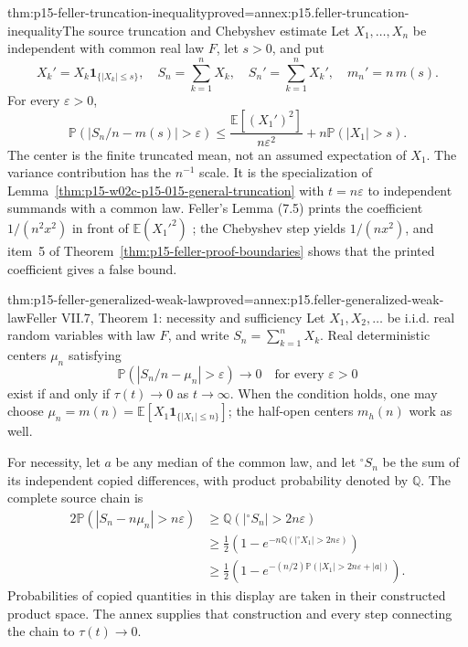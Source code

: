 \begin{hbtheorem}{thm:p15-feller-truncation-inequality}{proved=annex:p15.feller-truncation-inequality}{The source truncation and Chebyshev estimate}
Let \(X_1,\ldots,X_n\) be independent with common real law \(F\),
let \(s>0\), and put
\[
 X_k'=X_k\mathbf1_{\{|X_k|\leq s\}},\quad
 S_n=\sum_{k=1}^nX_k,\quad S_n'=\sum_{k=1}^nX_k',
 \quad m_n'=n\,m(s).
\]
For every \(\varepsilon>0\),
\[
 \mathbb P(|S_n/n-m(s)|>\varepsilon)
 \leq\frac{\mathbb E[(X_1')^2]}{n\varepsilon^2}
                         +n\mathbb P(|X_1|>s).
\]
The center is the finite truncated mean, not an assumed expectation
of \(X_1\). The variance contribution has the \(n^{-1}\) scale.
It is the specialization of
Lemma~\ref{thm:p15-w02c-p15-015-general-truncation} with
\(t=n\varepsilon\) to independent summands with a common law. Feller's
Lemma (7.5) prints the coefficient \(1/(n^2x^2)\) in front of
\(\mathbb E(X_1'^2)\) \cite[VII.7, p.~235]{Feller1971ProbabilityII};
the Chebyshev step yields \(1/(nx^2)\), and item~5 of
Theorem~\ref{thm:p15-feller-proof-boundaries} shows that the printed
coefficient gives a false bound.
\end{hbtheorem}

\begin{hbtheorem}{thm:p15-feller-generalized-weak-law}{proved=annex:p15.feller-generalized-weak-law}{Feller VII.7, Theorem 1: necessity and sufficiency}
Let \(X_1,X_2,\ldots\) be i.i.d. real random variables with law
\(F\), and write \(S_n=\sum_{k=1}^nX_k\). Real deterministic
centers \(\mu_n\) satisfying
\[
 \mathbb P(|S_n/n-\mu_n|>\varepsilon)\longrightarrow0
                           \quad\text{for every }\varepsilon>0
\]
exist if and only if \(\tau(t)\to0\) as \(t\to\infty\).
When the condition holds, one may choose
\(\mu_n=m(n)=\mathbb E[X_1\mathbf1_{\{|X_1|\leq n\}}]\);
the half-open centers \(m_h(n)\) work as well.

For necessity, let \(a\) be any median of the common law, and let
\({}^{\circ}S_n\) be the sum of its independent copied differences,
with product probability denoted by \(\mathbb Q\). The complete source chain is
\[
 \begin{aligned}
 2\mathbb P(|S_n-n\mu_n|>n\varepsilon)
 &\geq\mathbb Q(|{}^{\circ}S_n|>2n\varepsilon)\\
 &\geq\tfrac12\left(1-e^{-n\mathbb Q(|{}^{\circ}X_1|>2n\varepsilon)}\right)\\
 &\geq\tfrac12\left(1-e^{-(n/2)\mathbb P(|X_1|>2n\varepsilon+|a|)}\right).
 \end{aligned}
\]
Probabilities of copied quantities in this display are taken in their
constructed product space. The annex supplies that construction and
every step connecting the chain to \(\tau(t)\to0\).
\end{hbtheorem}


